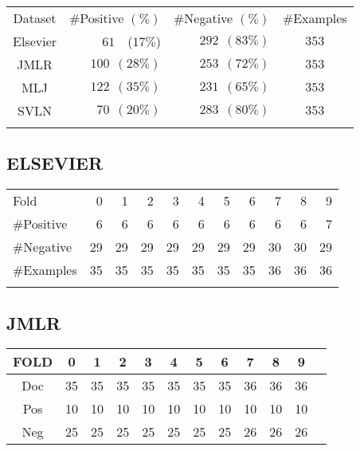 \begin{table}[htbp]
	\label{tab:datasets}
	\centering
\begin{tabular}{c@{\qquad}r@{\qquad}r@{\qquad}c}
\toprule
\addlinespace
Dataset & \#Positive $(\%)$ & \#Negative $(\%)$ & \#Examples \\
\addlinespace
\midrule
\addlinespace
Elsevier & $61$~~($17\%$) & $292~~(83\%)$ & $353$ \\
JMLR     & $100~~(28\%)$ & $253~~(72\%)$ & $353$ \\
MLJ      & $122~~(35\%)$ & $231~~(65\%)$ & $353$ \\
SVLN     & $70~~(20\%)$ & $283~~(80\%)$ & $353$ \\
\addlinespace
\bottomrule
\end{tabular}
\end{table}



\subsection{ELSEVIER}
\begin{table}[htbp]
	\centering
		\begin{tabular}{l@{\qquad}*{10}{r}}
		\toprule
\addlinespace
			Fold &  0 &  1 &  2 &  3 &  4 &  5 &  6 &  7 &  8 &  9 \\
\addlinespace
\midrule
\addlinespace
\#Positive  & 6  & 6  &  6 &  6 &  6 &  6 &  6 &  6 &  6 &  7 \\
\#Negative  & 29 & 29 & 29 & 29 & 29 & 29 & 29 & 30 & 30 & 29 \\
\#Examples & 35 & 35 & 35 & 35 & 35 & 35 & 35 & 36 & 36 & 36 \\
\addlinespace
\bottomrule
		\end{tabular}
	\label{tab:Elsevier}
\end{table}


\subsection{JMLR}
\begin{table}[htbp]
	\centering
		\begin{tabular}{c | ccccccccccc}
			FOLD &  0 &  1 &  2 &  3 &  4 &  5 &  6 &  7 &  8 &  9 \\ \hline
			Doc  & 35 & 35 & 35 & 35 & 35 & 35 & 35 & 36 & 36 & 36 \\
			Pos  & 10  & 10  &  10 &  10 &  10 &  10 &  10 &  10 &  10 &  10 \\
			Neg  & 25 & 25 & 25 & 25 & 25 & 25 & 25 & 26 & 26 & 26 \\
		\end{tabular}%
	\label{tab:JMLR}
\end{table}
